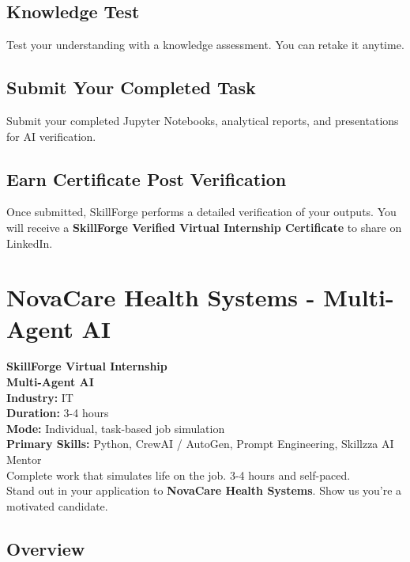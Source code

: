 \documentclass{article}
\begin{document}
\subsection*{Knowledge Test}
Test your understanding with a knowledge assessment. You can retake it anytime.\\

\subsection*{Submit Your Completed Task}
Submit your completed Jupyter Notebooks, analytical reports, and presentations for AI verification.\\

\subsection*{Earn Certificate Post Verification}
Once submitted, SkillForge performs a detailed verification of your outputs. You will receive a \textbf{SkillForge Verified Virtual Internship Certificate} to share on LinkedIn.\\

\newpage

\section{NovaCare Health Systems - Multi-Agent AI}

\textbf{SkillForge Virtual Internship} \\
\textbf{Multi-Agent AI} \\

\textbf{Industry:} IT \\
\textbf{Duration:} 3-4 hours \\
\textbf{Mode:} Individual, task-based job simulation \\
\textbf{Primary Skills:} Python, CrewAI / AutoGen, Prompt Engineering, Skillzza AI Mentor \\

Complete work that simulates life on the job. 3-4 hours and self-paced. \\
Stand out in your application to \textbf{NovaCare Health Systems}. Show us you're a motivated candidate. \\

\subsection*{Overview}
\end{document}
